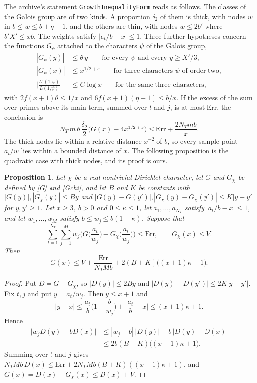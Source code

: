 \documentclass[11pt,letterpaper]{article}
\newtheorem{proposition}[theorem]{Proposition}
\numberwithin{equation}{section}
\begin{document}
The archive's statement \texttt{GrowthInequalityForm} reads as follows. The classes of the Galois group are of two kinds. A proportion $\delta_2$ of them is thick, with nodes $w$ in $b\le w\le b+\eta+1$, and the others are thin, with nodes $w\le2b'$ where $b'X'\le xb$. The weights satisfy $|a_t/b-x|\le1$. Three further hypotheses concern the functions $G_\psi$ attached to the characters $\psi$ of the Galois group,
\begin{align}
|G_\psi(y)|&\le\theta\,y\qquad\text{for every }\psi\text{ and every }y\ge X'/3,\label{thin}\\
|G_\psi(x)|&\le x^{1/2+\varepsilon}\qquad\text{for three characters }\psi\text{ of order two},\label{valx}\\
\Big|\frac{L'(1,\psi)}{L(1,\psi)}\Big|&\le C\log x\qquad\text{for the same three characters},\label{ellx}
\end{align}
with $2f(x+1)\theta\le1/x$ and $6f(x+1)(\eta+1)\le b/x$. If the excess of the sum over primes above its main term, summed over $t$ and $j$, is at most $\mathrm{Err}$, the conclusion is
\[
N_T\,m\,b\,\frac{\delta_2}2\Big(G(x)-4x^{1/2+\varepsilon}\Big)\le\mathrm{Err}+\frac{2N_Tmb}{x}.
\]
The thick nodes lie within a relative distance $x^{-2}$ of $b$, so every sample point $a_t/w$ lies within a bounded distance of $x$. The following proposition is the quadratic case with thick nodes, and its proof is ours.

\begin{proposition}\label{linkprop}
Let $\chi$ be a real nontrivial Dirichlet character, let $G$ and $G_\chi$ be defined by \eqref{G} and \eqref{Gchi}, and let $B$ and $K$ be constants with $|G(y)|,|G_\chi(y)|\le By$ and $|G(y)-G(y')|,|G_\chi(y)-G_\chi(y')|\le K|y-y'|$ for $y,y'\ge1$. Let $x\ge3$, $b>0$ and $0\le\kappa\le1$, let $a_1,\dots,a_{N_T}$ satisfy $|a_t/b-x|\le1$, and let $w_1,\dots,w_M$ satisfy $b\le w_j\le b(1+\kappa)$. Suppose that
\[
\sum_{t=1}^{N_T}\sum_{j=1}^Mw_j\Big(G\Big(\frac{a_t}{w_j}\Big)-G_\chi\Big(\frac{a_t}{w_j}\Big)\Big)\le\mathrm{Err},
\qquad G_\chi(x)\le V .
\]
Then
\[
G(x)\le V+\frac{\mathrm{Err}}{N_TMb}+2(B+K)\big((x+1)\kappa+1\big).
\]
\end{proposition}
\begin{proof}
Put $D=G-G_\chi$, so $|D(y)|\le2By$ and $|D(y)-D(y')|\le2K|y-y'|$. Fix $t,j$ and put $y=a_t/w_j$. Then $y\le x+1$ and
\[
|y-x|\le\frac{a_t}{b}\Big(1-\frac b{w_j}\Big)+\Big|\frac{a_t}b-x\Big|\le(x+1)\kappa+1 .
\]
Hence
\begin{align*}
\big|w_jD(y)-bD(x)\big|&\le|w_j-b|\,|D(y)|+b\,|D(y)-D(x)|\\
&\le2b(B+K)\big((x+1)\kappa+1\big).
\end{align*}
Summing over $t$ and $j$ gives $N_TMb\,D(x)\le\mathrm{Err}+2N_TMb(B+K)((x+1)\kappa+1)$, and $G(x)=D(x)+G_\chi(x)\le D(x)+V$.
\end{proof}
\end{document}
